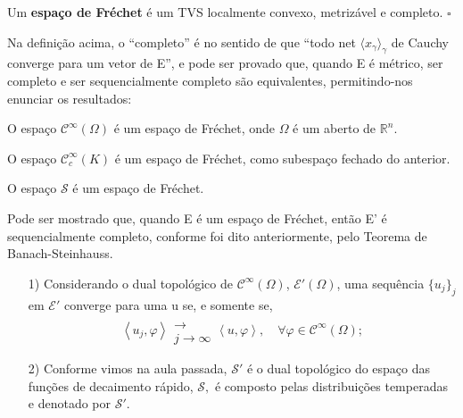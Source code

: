 \documentclass[../distribution_theory_notes.tex]{subfiles}
\begin{document}
   \begin{def*}
     Um \textbf{espaço de Fréchet} é um TVS localmente convexo, metrizável e completo. \(\square\)
   \end{def*}

   Na definição acima, o ``completo'' é no sentido de que ``todo net \(\langle x_{\gamma } \rangle_{\gamma }\) de Cauchy converge para um vetor de E'', e pode ser provado que, quando E é métrico, ser completo e ser sequencialmente completo são equivalentes, permitindo-nos enunciar os resultados: 

 \begin{theorem*}
   O espaço \(\mathcal{C}^{\infty}(\Omega )\) é um espaço de Fréchet, onde \(\Omega \) é um aberto de \(\mathbb{R}^{n}\). 
 \end{theorem*}
\begin{crl*}
  O espaço \(\mathcal{C}_{c}^{\infty}(K )\) é um espaço de Fréchet, como subespaço fechado do anterior. 
\end{crl*}
\begin{theorem*}
   O espaço \(\mathcal{S}\) é um espaço de Fréchet.
 \end{theorem*}

     \begin{tcolorbox}[
     skin=enhanced,
     title=Observação,
     fonttitle=\bfseries,
   colframe=black,
     colbacktitle=cyan!75!white, 
     colback=cyan!15,
     colbacklower=black,
   coltitle=black,
     drop fuzzy shadow,
     ]
     Pode ser mostrado que, quando E é um espaço de Fréchet, então E' é sequencialmente completo, conforme foi dito anteriormente, pelo Teorema de Banach-Steinhauss.
     \end{tcolorbox}

    \begin{example}
     \begin{itemize}
       \item[1)] Considerando o dual topológico de \(\mathcal{C}^{\infty}(\Omega )\), \(\mathcal{E}'(\Omega )\), uma sequência \(\{u_{j}\}_{j}\) em \(\mathcal{E}'\) converge para uma u se, e somente se, 
         \[
           \left< u_{j}, \varphi  \right>\substack{ \\ \longrightarrow \\ j\to \infty} \left< u, \varphi  \right>,\quad \forall \varphi \in \mathcal{C}^{\infty}(\Omega );
         \]
         \item[2)] Conforme vimos na aula passada, \(\mathcal{S}'\) é o dual topológico do espaço das funções de decaimento rápido, \(\mathcal{S},\) é composto pelas distribuições temperadas e denotado por \(\mathcal{S}'\).
     \end{itemize}
    \end{example}
\end{document}

